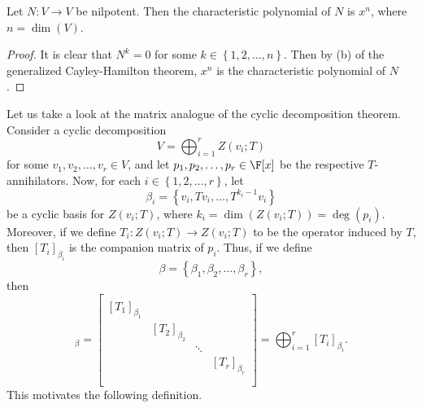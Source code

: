 \documentclass[linearalgebraII]{subfiles}
\begin{document}
    \begin{cor}{}
        Let $N:V\to V$ be nilpotent. Then the characteristic polynomial of $N$ is $x^n$, where $n=\dim(V)$.
    \end{cor}	

    \begin{proof}
        It is clear that $N^k=0$ for some $k\in\left\lbrace 1,2,\ldots,n \right\rbrace $. Then by (b) of the generalized Cayley-Hamilton theorem, $x^n$ is the characteristic polynomial of $N$.
    \end{proof}
    
    \begin{remark}
        Let us take a look at the matrix analogue of the cyclic decomposition theorem. Consider a cyclic decomposition
        \begin{equation*}
            V = \bigoplus^{r}_{i=1} Z\left( v_i;T \right) 
        \end{equation*}
        for some $v_1,v_2,\ldots,v_r\in V$, and let $p_1,p_2,\ldots,p_r\in\F[x]$ be the respective $T$-annihilators. Now, for each $i\in \left\lbrace 1,2,\ldots,r \right\rbrace $, let
        \begin{equation*}
            \beta_i = \left\lbrace v_i, Tv_i, \ldots, T^{k_i-1}v_i \right\rbrace 
        \end{equation*}
        be a cyclic basis for $Z\left( v_i;T \right)$, where $k_i=\dim\left( Z\left( v_i;T \right)  \right) = \deg\left( p_i \right)$. Moreover, if we define $T_i:Z\left( v_i;T \right) \to Z\left( v_i;T \right)$ to be the operator induced by $T$, then $\left[ T_i \right] _{\beta_i}$ is the companion matrix of $p_i$. Thus, if we define
        \begin{equation*}
            \beta = \left\lbrace \beta_1,\beta_2, \ldots,\beta_r \right\rbrace ,
        \end{equation*}
        then
        \begin{equation*}
            [T]_\beta = 
            \begin{bmatrix}
                & & & \\
                \left[ T_1 \right]_{\beta_1} & & & \\
                & \left[ T_2 \right]_{\beta_2} & & \\
                & & \ddots & \\
                & & & \left[ T_r \right]_{\beta_r}\\
                & & & \\
            \end{bmatrix}
            = \bigoplus^{r}_{i=1} \left[ T_i \right] _{\beta_i}.
        \end{equation*}
        This motivates the following definition.
    \end{remark}
\end{document}
